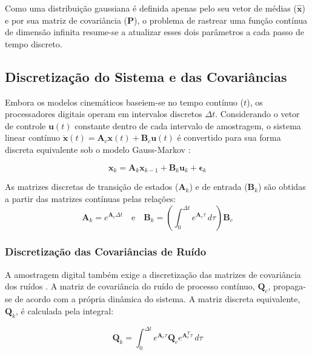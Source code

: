 Como uma distribuição gaussiana é definida apenas pelo seu vetor de médias ($\hat{\mathbf{x}}$) e por sua matriz de covariância ($\mathbf{P}$), o problema de rastrear uma função contínua de dimensão infinita resume-se a atualizar esses dois parâmetros a cada passo de tempo discreto.

\subsection{Discretização do Sistema e das Covariâncias}
\label{subsec:discretization}

Embora os modelos cinemáticos baseiem-se no tempo contínuo ($t$), os processadores digitais operam em intervalos discretos $\Delta t$. Considerando o vetor de controle $\mathbf{u}(t)$ constante dentro de cada intervalo de amostragem, o sistema linear contínuo $\dot{\mathbf{x}}(t) = \mathbf{A}_c \mathbf{x}(t) + \mathbf{B}_c \mathbf{u}(t)$ é convertido para sua forma discreta equivalente sob o modelo Gauss-Markov \cite{simon2006optimal}:

\begin{equation}
    \label{eq:sistema_discreto}
    \mathbf{x}_k = \mathbf{A}_k \mathbf{x}_{k-1} + \mathbf{B}_k \mathbf{u}_k + \boldsymbol{\epsilon}_k
\end{equation}

As matrizes discretas de transição de estados ($\mathbf{A}_k$) e de entrada ($\mathbf{B}_k$) são obtidas a partir das matrizes contínuas pelas relações:
\begin{equation}
    \label{eq:matrizes_discretas}
    \mathbf{A}_k = e^{\mathbf{A}_c \Delta t} \quad \text{e} \quad \mathbf{B}_k = \left( \int_{0}^{\Delta t} e^{\mathbf{A}_c \tau} \, d\tau \right) \mathbf{B}_c
\end{equation}

\subsubsection*{Discretização das Covariâncias de Ruído}

A amostragem digital também exige a discretização das matrizes de covariância dos ruídos \cite{simon2006optimal}. A matriz de covariância do ruído de processo contínuo, $\mathbf{Q}_c$, propaga-se de acordo com a própria dinâmica do sistema. A matriz discreta equivalente, $\mathbf{Q}_k$, é calculada pela integral:

\begin{equation}
    \label{eq:covariancia_discreta}
    \mathbf{Q}_k = \int_{0}^{\Delta t} e^{\mathbf{A}_c \tau} \mathbf{Q}_c e^{\mathbf{A}_c^T \tau} \, d\tau
\end{equation}

